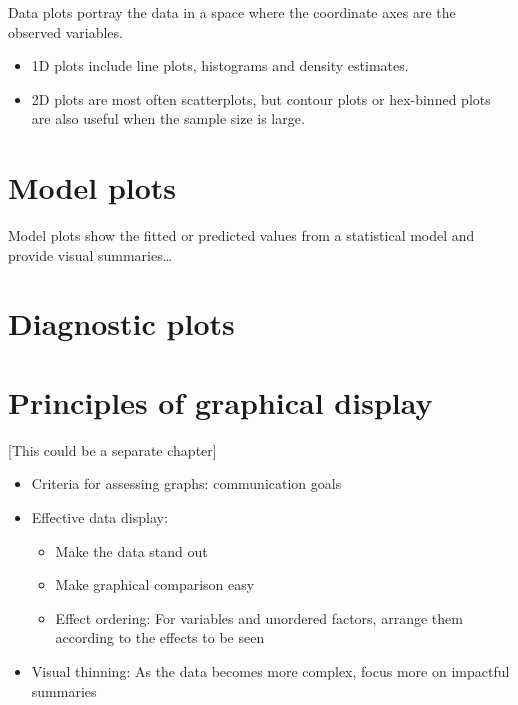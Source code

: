 \documentclass[
  letterpaper,
  10pt,
  krantz2]{krantz}
\providecommand{\tightlist}{%
  \setlength{\itemsep}{0pt}\setlength{\parskip}{0pt}}\usepackage{longtable,booktabs,array}
\begin{document}

Data plots portray the data in a space where the coordinate axes are the
observed variables.

\begin{itemize}
\tightlist
\item
  1D plots include line plots, histograms and density estimates.
\item
  2D plots are most often scatterplots, but contour plots or hex-binned
  plots are also useful when the sample size is large.
\end{itemize}

\hypertarget{model-plots}{%
\section*{Model plots}\label{model-plots}}


Model plots show the fitted or predicted values from a statistical model
and provide visual summaries\ldots{}

\hypertarget{diagnostic-plots}{%
\section*{Diagnostic plots}\label{diagnostic-plots}}


\hypertarget{principles-of-graphical-display}{%
\section*{Principles of graphical
display}\label{principles-of-graphical-display}}


{[}This could be a separate chapter{]}

\begin{itemize}
\tightlist
\item
  Criteria for assessing graphs: communication goals
\item
  Effective data display:

  \begin{itemize}
  \tightlist
  \item
    Make the data stand out
  \item
    Make graphical comparison easy
  \item
    Effect ordering: For variables and unordered factors, arrange them
    according to the effects to be seen
  \end{itemize}
\item
  Visual thinning: As the data becomes more complex, focus more on
  impactful summaries
\end{itemize}
\end{document}
